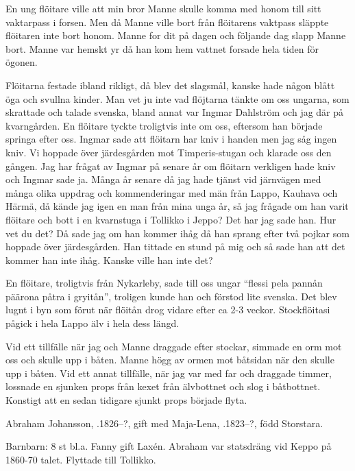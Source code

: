 En ung flöitare ville att min bror Manne skulle komma med honom till sitt vaktarpass i forsen. Men då Manne ville bort från flöitarens vaktpass släppte flöitaren inte bort honom. Manne for dit på dagen och följande dag slapp Manne bort. Manne var hemskt yr då han kom hem vattnet forsade hela tiden för ögonen.

Flöitarna festade ibland rikligt, då blev det slagsmål, kanske hade någon blått öga och svullna kinder. Man vet ju inte vad flöjtarna tänkte om oss ungarna, som skrattade och talade svenska, bland annat var Ingmar Dahlström och jag där på kvarngården. En flöitare tyckte troligtvis inte om oss, eftersom han började springa efter oss. Ingmar sade att flöitarn har kniv i handen men jag såg ingen kniv. Vi hoppade över järdesgården mot Timperis-stugan och klarade oss den gången. Jag har frågat av Ingmar på senare år om flöitarn verkligen hade kniv och Ingmar sade ja. Många år senare då jag hade tjänst vid järnvägen med många olika uppdrag och kommenderingar med män från Lappo, Kauhava och Härmä, då kände jag igen en man från mina unga år, så jag frågade om han varit flöitare och bott i en kvarnstuga i Tollikko i Jeppo? Det har jag sade han. Hur vet du det? Då sade jag om han kommer ihåg då han sprang efter två pojkar som hoppade över järdesgården. Han tittade en stund på mig och så sade han att det kommer han inte ihåg. Kanske ville han inte det?

En flöitare, troligtvis från Nykarleby, sade till oss ungar ``flessi pela pannån päärona påtra i gryitån'', troligen kunde han och förstod lite svenska. Det blev lugnt i byn som förut när flöitån drog vidare efter ca 2-3 veckor. Stockflöitasi pågick i hela Lappo älv i hela dess längd.

Vid ett tillfälle när jag och Manne draggade efter stockar, simmade en orm mot oss och skulle upp i båten. Manne högg av ormen mot båtsidan när den skulle upp i båten. Vid ett annat tillfälle, när jag var med far och draggade timmer, lossnade en sjunken props från kexet från älvbottnet och slog i båtbottnet. Konstigt att en sedan tidigare sjunkt props började flyta.




Abraham Johansson, .1826--?, gift med Maja-Lena, .1823--?, född Storstara.
\begin{jhchildren}
  \item {}
  \item {}
\end{jhchildren}
Barnbarn: 8 st bl.a. Fanny gift Laxén. Abraham var statsdräng vid Keppo på 1860-70 talet. Flyttade till Tollikko.


